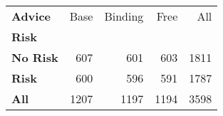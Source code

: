 \begin{tabular}{lrrrr}
\toprule
\textbf{Advice} &  Base &  Binding &  Free &   All \\
\textbf{Risk   } &       &          &       &       \\
\midrule
\textbf{No Risk} &   607 &      601 &   603 &  1811 \\
\textbf{Risk   } &   600 &      596 &   591 &  1787 \\
\textbf{All    } &  1207 &     1197 &  1194 &  3598 \\
\bottomrule
\end{tabular}
